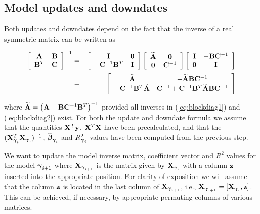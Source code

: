 \subsection{Model updates and downdates} 

\noindent Both updates and downdates depend on the fact that the inverse of a
real symmetric matrix can be written as

\begin{eqnarray}
	\displaystyle \left[ \begin{array}{cc}
		{\bf A}   & {\bf B} \\
		{\bf B}^T & {\bf C}
	\end{array} \right]^{-1}
	&  = &
	\displaystyle \left[ \begin{array}{cc}
		{\bf I} & {\bf 0} \\
		-{\bf C}^{-1}{\bf B}^T &  {\bf I}
	\end{array} \right]
	\left[ \begin{array}{cc}
		\widetilde{{\bf A}} & {\bf 0} \\
		{\bf 0} & {\bf C}^{-1}
	\end{array} \right]
	\left[ \begin{array}{cc}
		{\bf I}    & -{\bf B}{\bf C}^{-1}\\
		{\bf 0} & {\bf I}
	\end{array} \right] \label{eq:blockdiag1}\\
	&  = &
	\displaystyle\left[
	\begin{array}{cc}
		\widetilde{{\bf A}}
		& - \widetilde{{\bf A}}{\bf B}{\bf C}^{-1} \\
		-{\bf C}^{-1}{\bf B}^T\widetilde{{\bf A}}
		& {\bf C}^{-1} + {\bf C}^{-1}{\bf B}^T\widetilde{{\bf A}}{\bf B}{\bf C}^{-1}
	\end{array}\right]\label{eq:blockdiag2}
\end{eqnarray}

\noindent where $\widetilde{{\bf A}} = \left({\bf A}-{\bf B}{\bf C}^{-1}{\bf B}^T\right)^{-1}$
provided all inverses in (\ref{eq:blockdiag1}) and (\ref{eq:blockdiag2}) exist.
For both the update and downdate formula we assume that the quantities
${\bf X}^T{\bf y}$, ${\bf X}^T{\bf X}$ have been precalculated, and that the
$({\bf X}_{{\boldsymbol \gamma}_i}^T{\bf X}_{{\boldsymbol \gamma}_i})^{-1}$, $\widehat{{\boldsymbol \beta}}_{{\boldsymbol \gamma}_i}$ and
$R_{{\boldsymbol \gamma}_i}^2$ values have been computed from the previous step.

We want to update the model inverse matrix, coefficient vector and $R^2$ values
for the model ${\boldsymbol \gamma}_{i+1}$ where ${\bf X}_{{\boldsymbol \gamma}_{i+1}}$ is the matrix given
by ${\bf X}_{{\boldsymbol \gamma}_i}$ with a column ${\bf z}$ inserted into the appropriate
position.  For clarity of exposition we will assume that the column ${\bf z}$ is
located in the last column of ${\bf X}_{{\boldsymbol \gamma}_{i+1}}$, i.e., ${\bf X}_{{\boldsymbol \gamma}_{i+1}}
= [{\bf X}_{{\boldsymbol \gamma}_{i}},{\bf z}]$. This can be achieved, if necessary, by appropriate
permuting  columns of various matrices.

